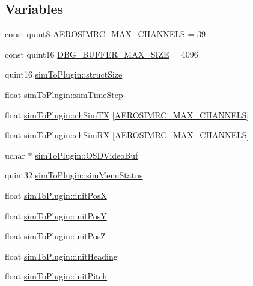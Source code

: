 \subsection*{\-Variables}
\begin{DoxyCompactItemize}
\item 
const quint8 \hyperlink{group___aero_sim_r_c_ga63f989ac10cdcbfefadc5e65055d3c7d}{\-A\-E\-R\-O\-S\-I\-M\-R\-C\-\_\-\-M\-A\-X\-\_\-\-C\-H\-A\-N\-N\-E\-L\-S} = 39
\item 
const quint16 \hyperlink{group___aero_sim_r_c_ga4ac56108ad3d382deff679f792d02874}{\-D\-B\-G\-\_\-\-B\-U\-F\-F\-E\-R\-\_\-\-M\-A\-X\-\_\-\-S\-I\-Z\-E} = 4096
\item 
quint16 \hyperlink{group___aero_sim_r_c_gab277fde5232c4a8c41adcdcc1dc7199f}{sim\-To\-Plugin\-::struct\-Size}
\item 
float \hyperlink{group___aero_sim_r_c_ga58a610591c7eb9b7e1f32208e4cb343c}{sim\-To\-Plugin\-::sim\-Time\-Step}
\item 
float \hyperlink{group___aero_sim_r_c_gae5ff2433affe60bce670d0c6bf66ee06}{sim\-To\-Plugin\-::ch\-Sim\-T\-X} \mbox{[}\hyperlink{group___aero_sim_r_c_ga63f989ac10cdcbfefadc5e65055d3c7d}{\-A\-E\-R\-O\-S\-I\-M\-R\-C\-\_\-\-M\-A\-X\-\_\-\-C\-H\-A\-N\-N\-E\-L\-S}\mbox{]}
\item 
float \hyperlink{group___aero_sim_r_c_gadefc3aa551adb807da0171a7a92f73ee}{sim\-To\-Plugin\-::ch\-Sim\-R\-X} \mbox{[}\hyperlink{group___aero_sim_r_c_ga63f989ac10cdcbfefadc5e65055d3c7d}{\-A\-E\-R\-O\-S\-I\-M\-R\-C\-\_\-\-M\-A\-X\-\_\-\-C\-H\-A\-N\-N\-E\-L\-S}\mbox{]}
\item 
uchar $\ast$ \hyperlink{group___aero_sim_r_c_gadc2b5a377a36c5f5d2dfae169880bb1c}{sim\-To\-Plugin\-::\-O\-S\-D\-Video\-Buf}
\item 
quint32 \hyperlink{group___aero_sim_r_c_ga1cc3af651b3f3382357e9a882abc64d4}{sim\-To\-Plugin\-::sim\-Menu\-Status}
\item 
float \hyperlink{group___aero_sim_r_c_ga23ae6e8ef17ad84cc500793e730df894}{sim\-To\-Plugin\-::init\-Pos\-X}
\item 
float \hyperlink{group___aero_sim_r_c_gacb4ac6e2ad9d5f215153b9fea05b66bf}{sim\-To\-Plugin\-::init\-Pos\-Y}
\item 
float \hyperlink{group___aero_sim_r_c_ga020dda7446e3217a8c779458a74feec8}{sim\-To\-Plugin\-::init\-Pos\-Z}
\item 
float \hyperlink{group___aero_sim_r_c_gaab0124b4fd93c132aacdb2cb2a755770}{sim\-To\-Plugin\-::init\-Heading}
\item 
float \hyperlink{group___aero_sim_r_c_gacc022659d5c4b32c0a878bdc6eea0f53}{sim\-To\-Plugin\-::init\-Pitch}

\end{DoxyCompactItemize}
